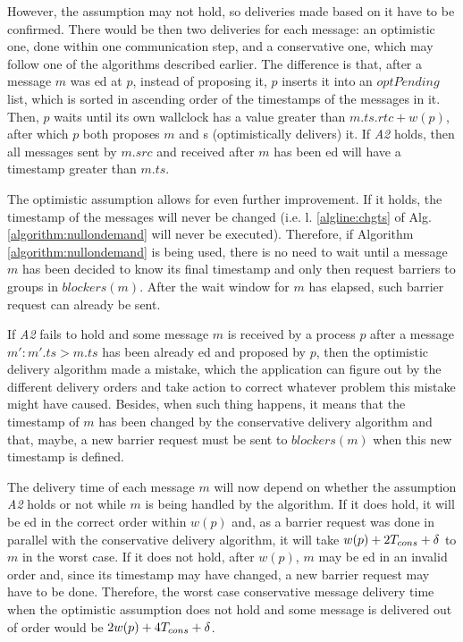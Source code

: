 \documentclass[times, 10pt]{article}
\begin{document}
However, the assumption may not hold, so deliveries made based on it have to be confirmed. There would be then two deliveries for each message: an optimistic one, done within one communication step, and a conservative one, which may follow one of the algorithms described earlier. The difference is that, after a message $m$ was \rmdel{}ed at $p$, instead of proposing it, $p$ inserts it into an $optPending$ list, which is sorted in ascending order of the timestamps of the messages in it. Then, $p$ waits until its own wallclock has a value greater than $m.ts.rtc + w(p)$, after which $p$ both proposes $m$ and \opt{}s (optimistically delivers) it. If \emph{A2} holds, then all messages sent by $m.src$ and received after $m$ has been \opt{}ed will have a timestamp greater than $m.ts$.

The optimistic assumption allows for even further improvement. If it holds, the timestamp of the messages will never be changed (i.e. l. \ref{algline:chgts} of Alg. \ref{algorithm:nullondemand} will never be executed). Therefore, if Algorithm \ref{algorithm:nullondemand} is being used, there is no need to wait until a message $m$ has been decided to know its final timestamp and only then request barriers to groups in $blockers(m)$. After the wait window for $m$ has elapsed, such barrier request can already be sent.

If \emph{A2} fails to hold and some message $m$ is received by a process $p$ after a message \mbox{$m' : m'.ts > m.ts$} has been already \opt{}ed and proposed by $p$, then the optimistic delivery algorithm made a mistake, which the application can figure out by the different delivery orders and take action to correct whatever problem this mistake might have caused. Besides, when such thing happens, it means that the timestamp of $m$ has been changed by the conservative delivery algorithm and that, maybe, a new barrier request must be sent to $blockers(m)$ when this new timestamp is defined.

The delivery time of each message $m$ will now depend on whether the assumption \emph{A2} holds or not while $m$ is being handled by the algorithm. If it does hold, it will be \opt{}ed in the correct order within $w(p)$ and, as a barrier request was done in parallel with the conservative delivery algorithm, it will take $w(p) + 2T_{cons} + \delta$ to \cons{} $m$ in the worst case. If it does not hold, after $w(p)$, $m$ may be \opt{}ed in an invalid order and, since its timestamp may have changed, a new barrier request may have to be done. Therefore, the worst case conservative message delivery time when the optimistic assumption does not hold and some message is delivered out of order would be $2w(p) + 4T_{cons} + \delta$.
\end{document}
